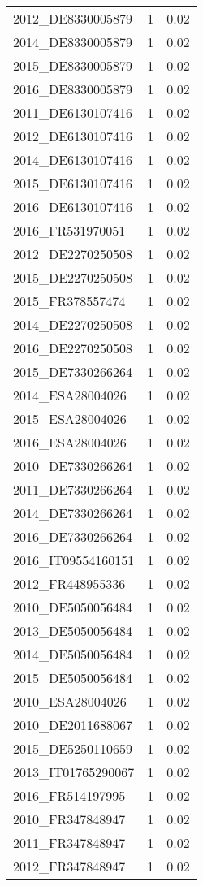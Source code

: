 \begin{table*}[htbp]
\begin{tabular}{lrr}
2012_DE8330005879 & 1 & 0.02 \\
2014_DE8330005879 & 1 & 0.02 \\
2015_DE8330005879 & 1 & 0.02 \\
2016_DE8330005879 & 1 & 0.02 \\
2011_DE6130107416 & 1 & 0.02 \\
2012_DE6130107416 & 1 & 0.02 \\
2014_DE6130107416 & 1 & 0.02 \\
2015_DE6130107416 & 1 & 0.02 \\
2016_DE6130107416 & 1 & 0.02 \\
2016_FR531970051 & 1 & 0.02 \\
2012_DE2270250508 & 1 & 0.02 \\
2015_DE2270250508 & 1 & 0.02 \\
2015_FR378557474 & 1 & 0.02 \\
2014_DE2270250508 & 1 & 0.02 \\
2016_DE2270250508 & 1 & 0.02 \\
2015_DE7330266264 & 1 & 0.02 \\
2014_ESA28004026 & 1 & 0.02 \\
2015_ESA28004026 & 1 & 0.02 \\
2016_ESA28004026 & 1 & 0.02 \\
2010_DE7330266264 & 1 & 0.02 \\
2011_DE7330266264 & 1 & 0.02 \\
2014_DE7330266264 & 1 & 0.02 \\
2016_DE7330266264 & 1 & 0.02 \\
2016_IT09554160151 & 1 & 0.02 \\
2012_FR448955336 & 1 & 0.02 \\
2010_DE5050056484 & 1 & 0.02 \\
2013_DE5050056484 & 1 & 0.02 \\
2014_DE5050056484 & 1 & 0.02 \\
2015_DE5050056484 & 1 & 0.02 \\
2010_ESA28004026 & 1 & 0.02 \\
2010_DE2011688067 & 1 & 0.02 \\
2015_DE5250110659 & 1 & 0.02 \\
2013_IT01765290067 & 1 & 0.02 \\
2016_FR514197995 & 1 & 0.02 \\
2010_FR347848947 & 1 & 0.02 \\
2011_FR347848947 & 1 & 0.02 \\
2012_FR347848947 & 1 & 0.02 \\

\end{tabular}
\end{table*}
